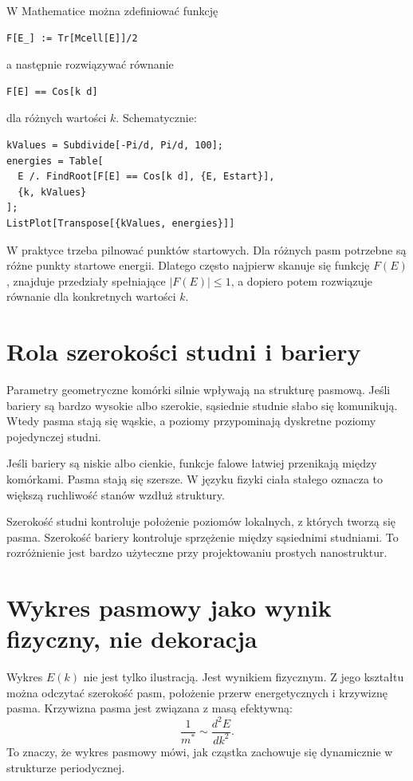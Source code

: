 W Mathematice można zdefiniować funkcję
\begin{verbatim}
F[E_] := Tr[Mcell[E]]/2
\end{verbatim}
a następnie rozwiązywać równanie
\begin{verbatim}
F[E] == Cos[k d]
\end{verbatim}
dla różnych wartości \(k\). Schematycznie:
\begin{verbatim}
kValues = Subdivide[-Pi/d, Pi/d, 100];
energies = Table[
  E /. FindRoot[F[E] == Cos[k d], {E, Estart}],
  {k, kValues}
];
ListPlot[Transpose[{kValues, energies}]]
\end{verbatim}
W praktyce trzeba pilnować punktów startowych. Dla różnych pasm potrzebne są różne punkty startowe energii. Dlatego często najpierw skanuje się funkcję \(F(E)\), znajduje przedziały spełniające \(|F(E)|\leq 1\), a dopiero potem rozwiązuje równanie dla konkretnych wartości \(k\).

\section{Rola szerokości studni i bariery}

Parametry geometryczne komórki silnie wpływają na strukturę pasmową. Jeśli bariery są bardzo wysokie albo szerokie, sąsiednie studnie słabo się komunikują. Wtedy pasma stają się wąskie, a poziomy przypominają dyskretne poziomy pojedynczej studni.

Jeśli bariery są niskie albo cienkie, funkcje falowe łatwiej przenikają między komórkami. Pasma stają się szersze. W języku fizyki ciała stałego oznacza to większą ruchliwość stanów wzdłuż struktury.

Szerokość studni kontroluje położenie poziomów lokalnych, z których tworzą się pasma. Szerokość bariery kontroluje sprzężenie między sąsiednimi studniami. To rozróżnienie jest bardzo użyteczne przy projektowaniu prostych nanostruktur.

\section{Wykres pasmowy jako wynik fizyczny, nie dekoracja}

Wykres \(E(k)\) nie jest tylko ilustracją. Jest wynikiem fizycznym. Z jego kształtu można odczytać szerokość pasm, położenie przerw energetycznych i krzywiznę pasma. Krzywizna pasma jest związana z masą efektywną:
\begin{equation}
    \frac{1}{m^*}\sim \frac{d^2E}{dk^2}.
\end{equation}
To znaczy, że wykres pasmowy mówi, jak cząstka zachowuje się dynamicznie w strukturze periodycznej.


